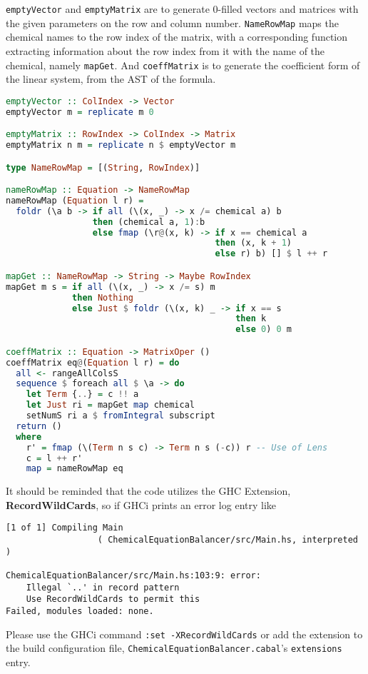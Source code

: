 \documentclass[12pt,a4paper]{article}
\begin{document}
\texttt{emptyVector} and \texttt{emptyMatrix} are to generate 0-filled vectors and matrices with the given parameters on the row and column number. \texttt{NameRowMap} maps the chemical names to the row index of the matrix, with a corresponding function extracting information about the row index from it with the name of the chemical, namely \texttt{mapGet}. And \texttt{coeffMatrix} is to generate the coefficient form of the linear system, from the AST of the formula.
\begin{lstlisting}[language=Haskell]
emptyVector :: ColIndex -> Vector
emptyVector m = replicate m 0

emptyMatrix :: RowIndex -> ColIndex -> Matrix
emptyMatrix n m = replicate n $ emptyVector m

type NameRowMap = [(String, RowIndex)]

nameRowMap :: Equation -> NameRowMap
nameRowMap (Equation l r) =
  foldr (\a b -> if all (\(x, _) -> x /= chemical a) b
                 then (chemical a, 1):b
                 else fmap (\r@(x, k) -> if x == chemical a
                                         then (x, k + 1)
                                         else r) b) [] $ l ++ r

mapGet :: NameRowMap -> String -> Maybe RowIndex
mapGet m s = if all (\(x, _) -> x /= s) m
             then Nothing
             else Just $ foldr (\(x, k) _ -> if x == s
                                             then k
                                             else 0) 0 m

coeffMatrix :: Equation -> MatrixOper ()
coeffMatrix eq@(Equation l r) = do
  all <- rangeAllColsS
  sequence $ foreach all $ \a -> do
    let Term {..} = c !! a
    let Just ri = mapGet map chemical
    setNumS ri a $ fromIntegral subscript
  return ()
  where
    r' = fmap (\(Term n s c) -> Term n s (-c)) r -- Use of Lens
    c = l ++ r'
    map = nameRowMap eq
\end{lstlisting}
It should be reminded that the code utilizes the GHC Extension, \textbf{RecordWildCards}, so if GHCi prints an error log entry like
\begin{lstlisting}
[1 of 1] Compiling Main
                  ( ChemicalEquationBalancer/src/Main.hs, interpreted )

ChemicalEquationBalancer/src/Main.hs:103:9: error:
    Illegal `..' in record pattern
    Use RecordWildCards to permit this
Failed, modules loaded: none.
\end{lstlisting}
Please use the GHCi command \texttt{:set -XRecordWildCards} or add the extension to the build configuration file, \texttt{ChemicalEquationBalancer.cabal}'s \texttt{extensions} entry.
\end{document}
